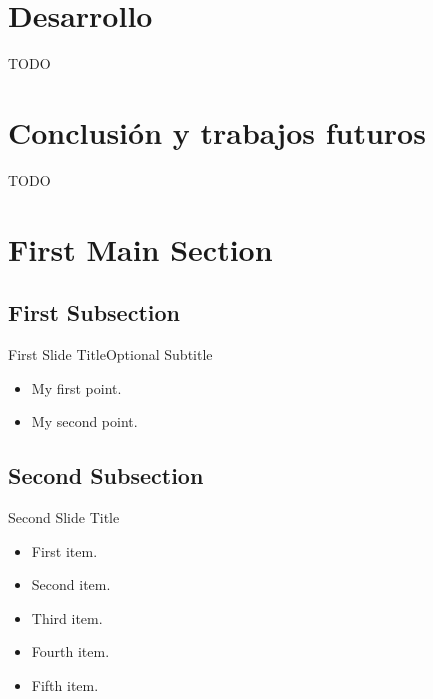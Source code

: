 \documentclass{beamer}
\begin{document}
\section{Desarrollo}
\begin{frame}{TODO}{}

\end{frame}

\section{Conclusión y trabajos futuros}
\begin{frame}{TODO}{}

\end{frame}

\section{First Main Section}

\subsection{First Subsection}

\begin{frame}{First Slide Title}{Optional Subtitle}
  \begin{itemize}
  \item {
    My first point.
  }
  \item {
    My second point.
  }
  \end{itemize}
\end{frame}

\subsection{Second Subsection}

\begin{frame}{Second Slide Title}
  \begin{itemize}
  \item {
    First item.
    \pause %
  }
  \item {   
    Second item.
  }
  \item<3-> {
    Third item.
  }
  \item<4-> {
    Fourth item.
  }
  \item<5-> {
    Fifth item. 
  }
  \end{itemize}
\end{frame}
\end{document}
